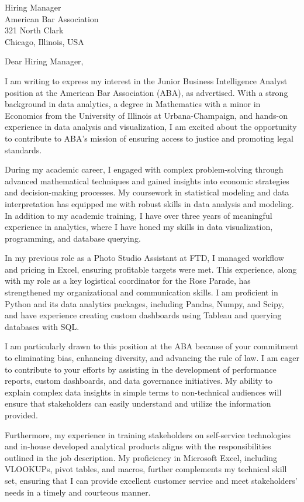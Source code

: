 \documentclass{letter}
\begin{document}
\begin{letter}{Hiring Manager\\American Bar Association\\321 North Clark\\Chicago, Illinois, USA}

\opening{Dear Hiring Manager,}

I am writing to express my interest in the Junior Business Intelligence Analyst position at the American Bar Association (ABA), as advertised. With a strong background in data analytics, a degree in Mathematics with a minor in Economics from the University of Illinois at Urbana-Champaign, and hands-on experience in data analysis and visualization, I am excited about the opportunity to contribute to ABA's mission of ensuring access to justice and promoting legal standards.

During my academic career, I engaged with complex problem-solving through advanced mathematical techniques and gained insights into economic strategies and decision-making processes. My coursework in statistical modeling and data interpretation has equipped me with robust skills in data analysis and modeling. In addition to my academic training, I have over three years of meaningful experience in analytics, where I have honed my skills in data visualization, programming, and database querying.

In my previous role as a Photo Studio Assistant at FTD, I managed workflow and pricing in Excel, ensuring profitable targets were met. This experience, along with my role as a key logistical coordinator for the Rose Parade, has strengthened my organizational and communication skills. I am proficient in Python and its data analytics packages, including Pandas, Numpy, and Scipy, and have experience creating custom dashboards using Tableau and querying databases with SQL.

I am particularly drawn to this position at the ABA because of your commitment to eliminating bias, enhancing diversity, and advancing the rule of law. I am eager to contribute to your efforts by assisting in the development of performance reports, custom dashboards, and data governance initiatives. My ability to explain complex data insights in simple terms to non-technical audiences will ensure that stakeholders can easily understand and utilize the information provided.

Furthermore, my experience in training stakeholders on self-service technologies and in-house developed analytical products aligns with the responsibilities outlined in the job description. My proficiency in Microsoft Excel, including VLOOKUPs, pivot tables, and macros, further complements my technical skill set, ensuring that I can provide excellent customer service and meet stakeholders' needs in a timely and courteous manner.


\end{letter}
\end{document}
